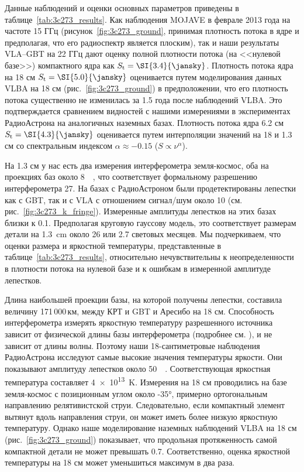Данные наблюдений и оценки основных параметров приведены в таблице~\ref{tab:3c273_results}. Как
наблюдения MOJAVE в феврале 2013 года на частоте 15 ГГц (рисунок~\ref{fig:3c273_ground}, принимая
плотность потока в ядре и предполагая, что его радиоспектр является плоским), так и наши результаты
VLA--GBT на 22 ГГц дают оценку полной плотности потока (на <<нулевой базе>>) компактного ядра как
$S_\text{t} = \SI{3.4}{\jansky}$. Плотность потока ядра на 18 см $S_\text{t} = \SI{5.0}{\jansky}$
оценивается путем моделирования данных VLBA на 18 см (рис.~\ref{fig:3c273_ground}) в предположении,
что его плотность потока существенно не изменилась за 1.5 года после наблюдений VLBA. Это
подтверждается сравнением видностей с нашими измерениями в экспериментах РадиоАстрона на аналогичных
наземных базах. Плотность потока ядра 6.2 см $S_\text{t} = \SI{4.3}{\jansky}$ оценивается путем
интерполяции значений на 18 и 1.3 см со спектральным индексом $\alpha \approx -0.15$ ($S \propto
\nu^\alpha$).

На 1.3 см у нас есть два измерения интерферометра земля-космос, оба на проекциях баз около
\SI{8}{\giga\la}, что соответствует формальному разрешению интерферометра \SI{27}{\uas}. На базах с
РадиоАстроном были продетектированы лепестки как с GBT, так и с VLA с отношением сигнал/шум около 10
(см. рис.~\ref{fig:3c273_k_fringe}). Измеренные амплитуды лепестков на этих базах близки к
\SI{0.1}{\jansky}. Предполагая круговую гауссову модель, это соответствует размерам детали на
\SI{1.3}{\cm} около \SI{26}{\uas} или 2.7 световых месяцев. Мы подчеркиваем, что оценки размера и
яркостной температуры, представленные в таблице~\ref{tab:3c273_results}, относительно
нечувствительны к неопределенности в плотности потока на нулевой базе и к ошибкам в измеренной
амплитуде лепестков.

Длина наибольшей проекции базы, на которой получены лепестки, составила величину 171\,000\,км, между
КРТ и GBT и Аресибо на 18 см. Способность интерферометра измерять яркостную температуру разрешенного
источника зависит от физической длины базы интерферометра (подробнее см. \cite{Kovalev_2005}), и не
зависит от длины волны. Поэтому наши 18-сантиметровые наблюдения РадиоАстрона исследуют самые
высокие значения температуры яркости. Они показывают амплитуду лепестков около
\SI{50}{\milli\jansky}. Соответствующая яркостная температура составляет \SI{4e13}{\kelvin}.
Измерения на 18 см проводились на базе земля-космос с позиционным углом около \ang{-35}, примерно
ортогональным направлению релятивистской струи. Следовательно, если компактный элемент вытянут вдоль
направления струи, он может иметь более низкую яркостную температуру. Однако наше моделирование
наземных наблюдений VLBA на 18 см (рис.~\ref{fig:3c273_ground}) показывает, что продольная
протяженность самой компактной детали не может превышать \SI{0.7}{\mas}. Соответственно, оценка
яркостной температуры на 18 см может уменьшиться максимум в два раза.

